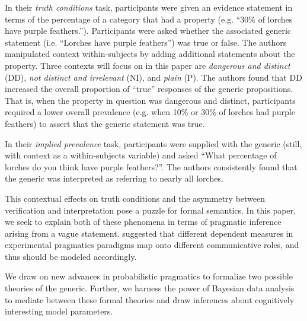 \documentclass[10pt,letterpaper]{article}
\begin{document}
In their \emph{truth conditions} task, participants were given an evidence statement in terms of the percentage of a category that had a property (e.g. ``30\% of lorches have purple feathers.''). Participants were asked whether the associated generic statement (i.e. ``Lorches have purple feathers'') was true or false. The authors manipulated context within-subjects by adding additional statements about the property. Three contexts will focus on in this paper are \emph{dangerous and distinct} (DD), \emph{not distinct and irrelevant} (NI), and \emph{plain} (P). The authors found that DD increased the overall proportion of ``true'' responses of the generic propositions. That is, when the property in question was dangerous and distinct, participants required a lower overall prevalence (e.g. when 10\% or 30\% of lorches had purple feathers) to assert that the generic statement was true.

In their \emph{implied prevalence} task, participants were supplied with the generic (still, with context as a within-subjects variable) and asked ``What percentage of lorches do you think have purple feathers?''. The authors consistently found that the generic was interpreted as referring to nearly all lorches. 

This contextual effects on truth conditions and the asymmetry between verification and interpretation pose a puzzle for formal semantics. In this paper, we seek to explain both of these phenomena in terms of pragmatic inference arising from a vague statement.  suggested that different dependent measures in experimental pragmatics paradigms map onto different communicative roles, and thus should be modeled accordingly. 

We draw on new advances in probabilistic pragmatics to formalize two possible theories of the generic. Further, we harness the power of Bayesian data analysis to mediate between these formal theories and draw inferences about cognitively interesting model parameters. 



\end{document}

